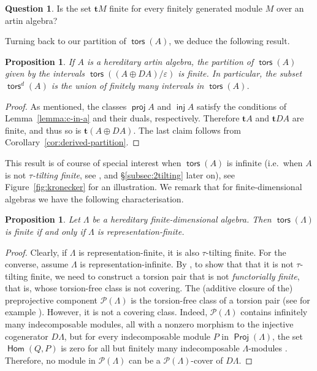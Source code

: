 \documentclass[a4paper,11pt]{amsart}
\theoremstyle{plain}
\newtheorem{prop}[thm]{Proposition}
\theoremstyle{definition}
\newtheorem{question}[thm]{Question}
\newcommand{\Pcal}{\mathcal{P}} \newcommand{\Qcal}{\mathcal{Q}} \newcommand{\Rcal}{\mathcal{R}}
\renewcommand{\epsilon}{\varepsilon}
\DeclareMathOperator{\Hom}{\mathsf{Hom}}
\DeclareMathOperator{\Proj}{\mathsf{Proj}}
\DeclareMathOperator{\proj}{\mathsf{proj}}
\DeclareMathOperator{\inj}{\mathsf{inj}}
\DeclareMathOperator{\tors}{\mathsf{tors}}
\begin{document}
\begin{question}
	Is the set $\mathbf{t}M$ finite for every finitely generated module $M$ over an
	artin algebra?
\end{question}

Turning back to our partition of $\tors(A)$, we deduce the following result.

\begin{prop}\label{prop:hereditary-partition-finite}
	If $A$ is a hereditary artin algebra, the partition of $\tors(A)$ given by the
	intervals $\tors((A\oplus DA)/\epsilon)$ is finite. In particular, the subset
	$\tors^d(A)$ is the union of finitely many intervals in $\tors(A)$.
\end{prop}

\begin{proof}
	As mentioned, the classes $\proj A$ and $\inj A$ satisfy the conditions of
	Lemma~\ref{lemma:c-in-a} and their duals, respectively. Therefore $\mathbf{t}A$ and
	$\mathbf{t}DA$ are finite, and thus so is $\mathbf{t}(A\oplus DA)$. The last
	claim follows from Corollary~\ref{cor:derived-partition}.
\end{proof}

This result is of course of special interest when $\tors(A)$ is infinite (i.e.\
when $A$ is not \emph{$\tau$-tilting finite}, see \cite{demo-iyam-jass-19}, and
\S\ref{subsec:2tilting} later on), see 
Figure~\ref{fig:kronecker} for an illustration.
We remark that for finite-dimensional algebras we have the following characterisation.

\begin{prop}
	Let $\Lambda$ be a hereditary finite-dimensional algebra. Then $\tors(\Lambda)$ is finite
	if and only if $\Lambda$ is representation-finite.
\end{prop}

\begin{proof}
	Clearly, if $\Lambda$ is representation-finite, it is also $\tau$-tilting
	finite. For the converse, assume $\Lambda$ is representation-infinite. By
	\cite[Theorem~3.8]{demo-iyam-jass-19}, to show that
	that it is not $\tau$-tilting finite, we need to construct a torsion pair that
	is not \emph{functorially finite}, that is, whose torsion-free class is not
	covering. The (additive closure of the) preprojective component
	$\Pcal(\Lambda)$ is the torsion-free class of a torsion pair (see for example
	\cite[Cor.~2.13]{asse-sims-skow-06}). However, it is not a covering class.
	Indeed, $\Pcal(\Lambda)$ contains infinitely many indecomposable modules, all
	with a nonzero morphism to the injective cogenerator $D\Lambda$, but for every
	indecomposable module $P$ in $\Proj(\Lambda)$, the set $\Hom(Q,P)$ is zero for
	all but finitely many indecomposable $\Lambda$-modules
	\cite[Lemma~VII.2.5]{asse-sims-skow-06}. Therefore, no module in
	$\Pcal(\Lambda)$ can be a $\Pcal(\Lambda)$-cover of $D\Lambda$.
\end{proof}
\end{document}
